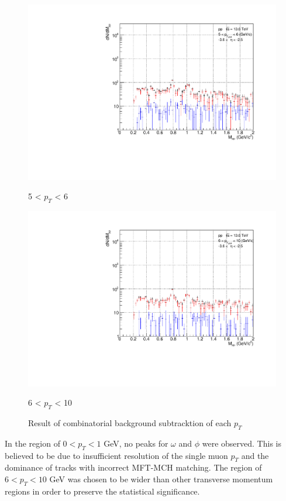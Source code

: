 \begin{figure}[H]
                    \vspace{1em}
                    \begin{minipage}{0.45\textwidth}
                        \centering
                        \includegraphics[width=\textwidth]{fig/3_4_1_CB_pt_5to6.pdf}
                        \caption*{5 < $p_{T}$ < 6}
                    \end{minipage}
                    \hfill
                    \begin{minipage}{0.45\textwidth}
                        \centering
                        \includegraphics[width=\textwidth]{fig/3_4_1_CB_pt_6to10.pdf}
                        \caption*{6 < $p_{T}$ < 10}
                    \end{minipage}
                    \caption{Result of combinatorial background subtracktion of each $p_T$}
                    \label{Analysis:Dimuon:CB:CB_pt_separation}
                \end{figure}
                In the region of \(0 < p_T < 1\) GeV, no peaks for \(\omega\) and \(\phi\) were observed. This is believed to be due to insufficient resolution of the single muon \(p_T\) and the dominance of tracks with incorrect MFT-MCH matching. The region of \(6 < p_T < 10\) GeV was chosen to be wider than other transverse momentum regions in order to preserve the statistical significance.
        
